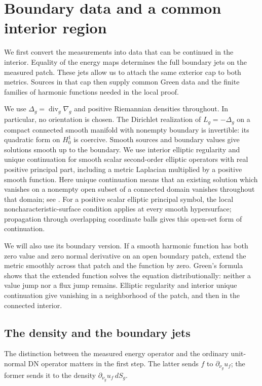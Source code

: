 \section{Boundary data and a common interior region}
\label{data:section}

We first convert the measurements into data that can be continued in the
interior. Equality of the energy maps determines the full boundary jets
on the measured patch. These jets allow us to attach the same exterior
cap to both metrics. Sources in that cap then supply common Green data
and the finite families of harmonic functions needed in the local proof.

We use $\Delta_g=\operatorname{div}_g\nabla_g$ and positive Riemannian
densities throughout. In particular, no orientation is chosen.
The Dirichlet realization of $L_g=-\Delta_g$ on a compact connected
smooth manifold with nonempty boundary is invertible: its quadratic
form on $H^1_0$ is coercive. Smooth sources and boundary values give
solutions smooth up to the boundary. We use interior elliptic
regularity and unique continuation for smooth scalar second-order
elliptic operators with real positive principal part, including a
metric Laplacian multiplied by a positive smooth function.
Here unique continuation means that an existing
solution which vanishes on a nonempty open subset of a connected
domain vanishes throughout that domain; see
\citep[Theorem~8]{KochTataru2005}.
For a positive scalar elliptic principal symbol, the local
noncharacteristic-surface condition applies at every smooth
hypersurface; propagation through overlapping coordinate balls gives
this open-set form of continuation.

We will also use its boundary version. If a smooth harmonic function
has both zero value and zero normal derivative on an open boundary
patch, extend the metric smoothly across that patch and the function
by zero. Green's formula shows that the extended function solves the
equation distributionally: neither a value jump nor a flux jump
remains. Elliptic regularity and interior unique continuation give
vanishing in a neighborhood of the patch, and then in the connected
interior.

\subsection{The density and the boundary jets}

The distinction between the measured energy operator and the ordinary
unit-normal DN operator matters in the first step. The latter sends
$f$ to $\partial_{\nu_g}u_f$; the former sends it to the density
$\partial_{\nu_g}u_f\,dS_g$.

